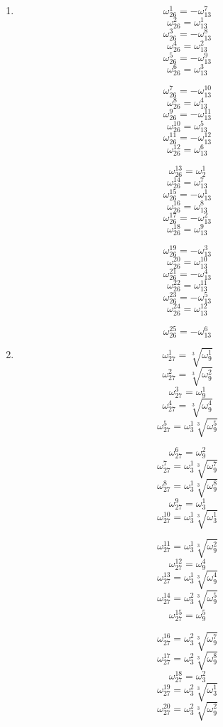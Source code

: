 \documentclass{article}
\begin{document}
\begin{enumerate}
\[ \omega_{25}^{21}=\omega_{5}^{4}\sqrt[5]{\omega_{5}^{1}} \]
\[ \omega_{25}^{22}=\omega_{5}^{4}\sqrt[5]{\omega_{5}^{2}} \]
\[ \omega_{25}^{23}=\sqrt[5]{\omega_{5}^{3}} \]
\[ \omega_{25}^{24}=\sqrt[5]{\omega_{5}^{4}} \]

\item \[ \omega_{26}^{1}=-\omega_{13}^{7} \]
\[ \omega_{26}^{2}=\omega_{13}^{1} \]
\[ \omega_{26}^{3}=-\omega_{13}^{8} \]
\[ \omega_{26}^{4}=\omega_{13}^{2} \]
\[ \omega_{26}^{5}=-\omega_{13}^{9} \]
\[ \omega_{26}^{6}=\omega_{13}^{3} \]

\[ \omega_{26}^{7}=-\omega_{13}^{10} \]
\[ \omega_{26}^{8}=\omega_{13}^{4} \]
\[ \omega_{26}^{9}=-\omega_{13}^{11} \]
\[ \omega_{26}^{10}=\omega_{13}^{5} \]
\[ \omega_{26}^{11}=-\omega_{13}^{12} \]
\[ \omega_{26}^{12}=\omega_{13}^{6} \]

\[ \omega_{26}^{13}=\omega_{2}^{1} \]
\[ \omega_{26}^{14}=\omega_{13}^{7} \]
\[ \omega_{26}^{15}=-\omega_{13}^{1} \]
\[ \omega_{26}^{16}=\omega_{13}^{8} \]
\[ \omega_{26}^{17}=-\omega_{13}^{2} \]
\[ \omega_{26}^{18}=\omega_{13}^{9} \]

\[ \omega_{26}^{19}=-\omega_{13}^{3} \]
\[ \omega_{26}^{20}=\omega_{13}^{10} \]
\[ \omega_{26}^{21}=-\omega_{13}^{4} \]
\[ \omega_{26}^{22}=\omega_{13}^{11} \]
\[ \omega_{26}^{23}=-\omega_{13}^{5} \]
\[ \omega_{26}^{24}=\omega_{13}^{12} \]

\[ \omega_{26}^{25}=-\omega_{13}^{6} \]

\item \[ \omega_{27}^{1}=\sqrt[3]{\omega_{9}^{1}} \]
\[ \omega_{27}^{2}=\sqrt[3]{\omega_{9}^{2}} \]
\[ \omega_{27}^{3}=\omega_{9}^{1} \]
\[ \omega_{27}^{4}=\sqrt[3]{\omega_{9}^{4}} \]
\[ \omega_{27}^{5}=\omega_{3}^{1}\sqrt[3]{\omega_{9}^{5}} \]

\[ \omega_{27}^{6}=\omega_{9}^{2} \]
\[ \omega_{27}^{7}=\omega_{3}^{1}\sqrt[3]{\omega_{9}^{7}} \]
\[ \omega_{27}^{8}=\omega_{3}^{1}\sqrt[3]{\omega_{9}^{8}} \]
\[ \omega_{27}^{9}=\omega_{3}^{1} \]
\[ \omega_{27}^{10}=\omega_{3}^{1}\sqrt[3]{\omega_{3}^{1}} \]

\[ \omega_{27}^{11}=\omega_{3}^{1}\sqrt[3]{\omega_{9}^{2}} \]
\[ \omega_{27}^{12}=\omega_{9}^{4} \]
\[ \omega_{27}^{13}=\omega_{3}^{1}\sqrt[3]{\omega_{9}^{4}} \]
\[ \omega_{27}^{14}=\omega_{3}^{2}\sqrt[3]{\omega_{9}^{5}} \]
\[ \omega_{27}^{15}=\omega_{9}^{5} \]

\[ \omega_{27}^{16}=\omega_{3}^{2}\sqrt[3]{\omega_{9}^{7}} \]
\[ \omega_{27}^{17}=\omega_{3}^{2}\sqrt[3]{\omega_{9}^{8}} \]
\[ \omega_{27}^{18}=\omega_{3}^{2} \]
\[ \omega_{27}^{19}=\omega_{3}^{2}\sqrt[3]{\omega_{3}^{1}} \]
\[ \omega_{27}^{20}=\omega_{3}^{2}\sqrt[3]{\omega_{9}^{2}} \]


\end{enumerate}
\end{document}
